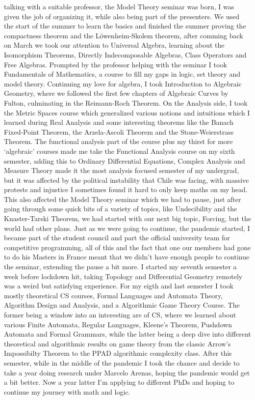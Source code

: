 \documentclass[letterpaper]{article}
\begin{document}
talking with a suitable professor, the Model Theory seminar was born, I was given the job of organizing it, while also being part of the presenters. We used the start of the summer to learn the basics and finished the summer proving the compactness theorem and the Löwenheim-Skolem theorem, after comming back on March we took our attention to Universal Algebra, learning about the Isomorphism Theorems, Directly Indecomposable Algebras, Class Operators and Free Algebras. Prompted by the professor helping with the seminar I took Fundamentals of Mathematics, a course to fill my gaps in logic, set theory and model theory. Continuing my love for algebra, I took Introduction to Algebraic Geometry, where we followed tbe first few chapters of Algebraic Curves by Fulton, culminating in the Reimann-Roch Theorem. On the Analysis side, I took the Metric Spaces course which generalized various notions and intuitions which I learned during Real Analysis and some interesting theorems like the Banach Fixed-Point Theorem, the Arzela-Ascoli Theorem and the Stone-Weierstrass Theorem. The functional analysis part of the course plus my thirst for more `algebraic' courses made me take the Functional Analysis course on my sixth semester, adding this to Ordinary Differential Equations, Complex Analysis and Measure Theory made it the most analysis focused semester of my undergrad, but it was affected by the political instability that Chile was facing, with massive protests and injustice I sometimes found it hard to only keep maths on my head. This also affected the Model Theory seminar which we had to pause, just after going through some quick bits of a variety of topics, like Undecibility and the Knaster-Tarski Theorem, we had started with our next big topic, Forcing, but the world had other plans. Just as we were going to continue, the pandemic started, I became part of the student council and part the official university team for competitive programming, all of this and the fact that one our members had gone to do his Masters in France meant that we didn't have enough people to continue the seminar, extending the pause a bit more. I started my seventh semester a week before lockdown hit, taking Topology and Differential Geometry remotely was a weird but satisfying experience. For my eigth and last semester I took mostly theoretical CS courses, Formal Languages and Automata Theory, Algorithm Design and Analysis, and a Algorithmic Game Theory Course. The former being a window into an interesting are of CS, where we learned about various Finite Automata, Regular Languages, Kleene's Theorem, Pushdown Automata and Formal Grammars, while the latter being a deep dive into different theoretical and algorithmic results on game theory from the classic Arrow's Impossibilty Theorem to the PPAD algorithmic complexity class. After this semester, while in the middle of the pandemic I took the chance and decide to take a year doing research under Marcelo Arenas, hoping the pandemic would get a bit better. Now a year latter I'm applying to different PhDs and hoping to continue my journey with math and logic.
\end{document}
